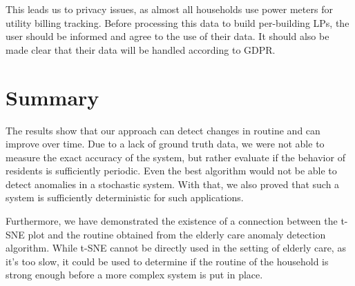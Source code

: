 This leads us to privacy issues, as almost all households use power meters for utility billing tracking. Before processing this data to build per-building LPs, the user should be informed and agree to the use of their data.
It should also be made clear that their data will be handled according to GDPR.

\section{Summary}

The results show that our approach can detect changes in routine and can improve over time.
Due to a lack of ground truth data, we were not able to measure the exact accuracy of the system,
but rather evaluate if the behavior of residents is sufficiently periodic.
Even the best algorithm would not be able to detect anomalies in a stochastic system.
With that, we also proved that such a system is sufficiently deterministic for such applications.

Furthermore, we have demonstrated the existence of a connection between the t-SNE plot and the routine obtained from the elderly care anomaly detection algorithm.
While t-SNE cannot be directly used in the setting of elderly care, as it's too slow, it could be used to determine if the routine of the household is strong enough before a more complex system is put in place.
